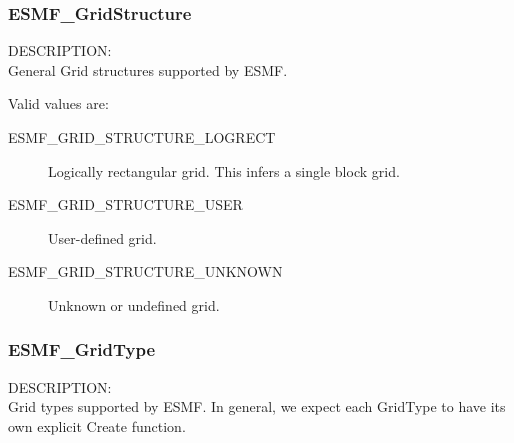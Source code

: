 
\subsubsection{ESMF\_GridStructure}

{\sf DESCRIPTION:\\}
General Grid structures supported by ESMF.

Valid values are:
\begin{description}
   \item [ESMF\_GRID\_STRUCTURE\_LOGRECT]
         Logically rectangular grid.  This infers a single block grid.

   \item [ESMF\_GRID\_STRUCTURE\_USER]
         User-defined grid.

   \item [ESMF\_GRID\_STRUCTURE\_UNKNOWN]
         Unknown or undefined grid.
\end{description}


\subsubsection{ESMF\_GridType}

{\sf DESCRIPTION:\\}
Grid types supported by ESMF.  In general, we expect each GridType to have
its own explicit Create function.

